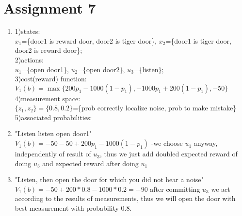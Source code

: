 \documentclass{article}
\begin{document}
\section*{Assignment 7}
\begin{enumerate}
\item 1)states:\\$x_1$=\{door1 is reward door, door2 is tiger door\}, 
$x_2$=\{door1 is tiger door, door2 is reward door\};
\\2)actions:\\
$u_1$=\{open door1\}, 
$u_2$=\{open door2\}, 
$u_3$=\{listen\};
\\3)cost(reward) function: \\
$V_{1}(b)=\max\{200p_{1}-1000(1-p_{1}), -1000p_{1}+200(1-p_{1}), -50\}$
\\4)measurement space:\\
$\{z_{1}, z_{2}\}=\{0.8, 0.2\}$=\{prob correctly localize noise, prob to make mistake\} \\
5)associated probabilities: \\

\item "Listen listen open door1"\\
$V_{1}(b)=-50-50+200p_{1}-1000(1-p_{1})$ -we choose $u_{1}$ anyway, independently of result of $u_{3}$, thus we just add doubled expected reward of doing $u_{3}$ and expected reward after doing $u_{1}$
\item "Listen,
then open the door for which you did not hear a noise"
$V_{1}(b)=-50+200*0.8-1000*0.2=-90$ after committing $u_{3}$ we act according to the results of measurements, thus we will open the door with best measurement with probability 0.8.
\end{enumerate}
\end{document}
